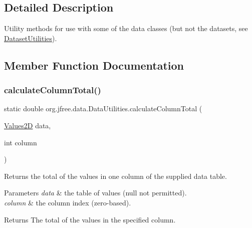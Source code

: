 \subsection{Detailed Description}
Utility methods for use with some of the data classes (but not the datasets, see \mbox{\hyperlink{}{Dataset\+Utilities}}). 

\subsection{Member Function Documentation}
\mbox{\label{classorg_1_1jfree_1_1data_1_1_data_utilities_a97fe30b8218c26a0ca6e2139c881bcf1}} 
\subsubsection{\texorpdfstring{calculate\+Column\+Total()}{calculateColumnTotal()}\hspace{0.1cm}{\footnotesize\ttfamily [1/2]}}
{\footnotesize\ttfamily static double org.\+jfree.\+data.\+Data\+Utilities.\+calculate\+Column\+Total (\begin{DoxyParamCaption}\item[{\mbox{\hyperlink{interfaceorg_1_1jfree_1_1data_1_1_values2_d}{Values2D}}}]{data,  }\item[{int}]{column }\end{DoxyParamCaption})\hspace{0.3cm}{\ttfamily [static]}}

Returns the total of the values in one column of the supplied data table.


\begin{DoxyParams}{Parameters}
{\em data} & the table of values ({\ttfamily null} not permitted). \\
\hline
{\em column} & the column index (zero-\/based).\\
\hline
\end{DoxyParams}
\begin{DoxyReturn}{Returns}
The total of the values in the specified column. 
\end{DoxyReturn}
\mbox{\label{classorg_1_1jfree_1_1data_1_1_data_utilities_aaae596932aff7c2a85ab7069e3945534}} 
